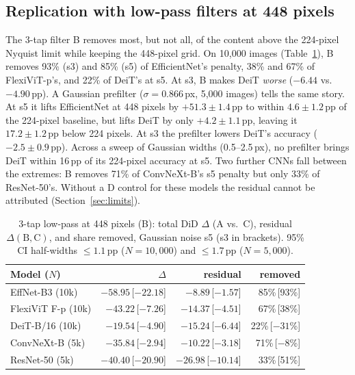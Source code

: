 \documentclass[conference]{IEEEtran}
\newcommand{\pp}{\,\mathrm{pp}}
\begin{document}
\subsection{Replication with low-pass filters at 448 pixels}
The 3-tap filter B removes most, but not all, of the content above the 224-pixel Nyquist limit while keeping the 448-pixel grid. On 10,000 images (Table~\ref{tab:bfilter}), B removes 93\% (s3) and 85\% (s5) of EfficientNet's penalty, 38\% and 67\% of FlexiViT-p's, and 22\% of DeiT's at s5. At s3, B makes DeiT \emph{worse} ($-6.44$ vs.\ $-4.90\pp$). A Gaussian prefilter ($\sigma=0.866$\,px, 5,000 images) tells the same story. At s5 it lifts EfficientNet at 448 pixels by $+51.3\pm1.4\pp$ to within $4.6\pm1.2\pp$ of the 224-pixel baseline, but lifts DeiT by only $+4.2\pm1.1\pp$, leaving it $17.2\pm1.2\pp$ below 224 pixels. At s3 the prefilter lowers DeiT's accuracy ($-2.5\pm0.9\pp$). Across a sweep of Gaussian widths (0.5--2.5\,px), no prefilter brings DeiT within 16\,pp of its 224-pixel accuracy at s5. Two further CNNs fall between the extremes: B removes 71\% of ConvNeXt-B's s5 penalty but only 33\% of ResNet-50's. Without a D control for these models the residual cannot be attributed (Section~\ref{sec:limits}).

\begin{table}[t]
\caption{3-tap low-pass at 448 pixels (B): total DiD $\Delta$ (A vs.\ C), residual $\Delta(\mathrm{B},\mathrm{C})$, and share removed, Gaussian noise s5 (s3 in brackets). 95\% CI half-widths $\le1.1\pp$ ($N=10{,}000$) and $\le1.7\pp$ ($N=5{,}000$).}
\label{tab:bfilter}
\centering
\setlength{\tabcolsep}{3.5pt}
\begin{tabular}{lrrr}
\toprule
Model ($N$) & $\Delta$ & residual & removed\\
\midrule
EffNet-B3 (10k) & $-58.95$\,[$-22.18$] & $-8.89$\,[$-1.57$] & 85\%\,[93\%]\\
FlexiViT F-p (10k) & $-43.22$\,[$-7.26$] & $-14.37$\,[$-4.51$] & 67\%\,[38\%]\\
DeiT-B/16 (10k) & $-19.54$\,[$-4.90$] & $-15.24$\,[$-6.44$] & 22\%\,[$-31$\%]\\
ConvNeXt-B (5k) & $-35.84$\,[$-2.94$] & $-10.22$\,[$-3.18$] & 71\%\,[$-8$\%]\\
ResNet-50 (5k) & $-40.40$\,[$-20.90$] & $-26.98$\,[$-10.14$] & 33\%\,[51\%]\\
\bottomrule
\end{tabular}
\end{table}
\end{document}
